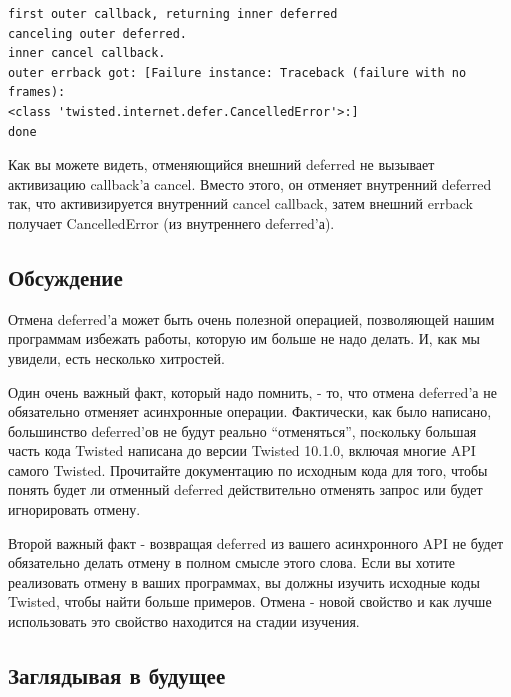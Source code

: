 \begin{scriptsize}\begin{verbatim}
first outer callback, returning inner deferred
canceling outer deferred.
inner cancel callback.
outer errback got: [Failure instance: Traceback (failure with no frames): 
<class 'twisted.internet.defer.CancelledError'>:]
done
\end{verbatim}\end{scriptsize}


Как вы можете видеть, отменяющийся внешний deferred не 
вызывает активизацию callback'а cancel. Вместо этого, 
он отменяет внутренний deferred так, что активизируется 
внутренний cancel callback, затем внешний errback 
получает CancelledError (из внутреннего deferred'а).


\subsection{Обсуждение}

Отмена deferred'а может быть очень полезной операцией, позволяющей 
нашим программам избежать работы, которую им больше не надо 
делать. И, как мы увидели, есть несколько хитростей.


Один очень важный факт, который надо помнить, - то, что 
отмена deferred'а не обязательно отменяет асинхронные 
операции. Фактически, как было написано, большинство 
deferred'ов не будут реально ``отменяться'', поcкольку 
большая часть кода Twisted написана до версии  Twisted 10.1.0, 
включая многие API самого Twisted. Прочитайте документацию 
по исходным кода для того, чтобы понять будет ли отменный 
deferred действительно отменять запрос или будет игнорировать 
отмену.


Второй важный факт - возвращая deferred из 
вашего асинхронного API не будет обязательно 
делать отмену в полном смысле этого слова. Если вы 
хотите реализовать отмену в ваших программах, 
вы должны изучить исходные коды Twisted, чтобы найти 
больше примеров. Отмена - новой свойство и как лучше 
использовать это свойство находится на стадии изучения.


\subsection{Заглядывая в будущее}

